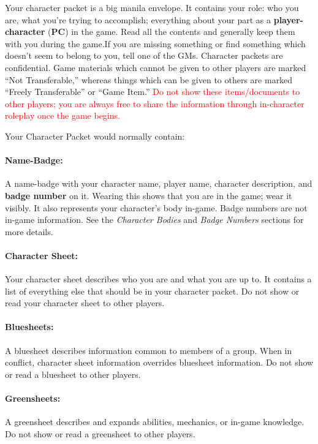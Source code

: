 \documentclass[sheet]{GL2020}
\begin{document}
Your character packet is a big manila envelope.  It contains your role: who you are, what you're trying to accomplish; everything about your part as a {\bf player-character} ({\bf PC}) in the game. Read all the contents and generally keep them with you during the game.If you are missing something or find something which doesn't seem to belong to you, tell one of the GMs.  Character packets are confidential. Game materials which cannot be given to other players are marked ``Not Transferable,'' whereas things which can be given to others are marked ``Freely Transferable'' or ``Game Item.''  \textcolor{red}{Do not show these items/documents to other players; you are always free to share the information through in-character roleplay once the game begins.}

Your Character Packet would normally contain:
\paragraph{Name-Badge:} A name-badge with your character name, player name, character description, and {\bf badge number} on it. Wearing this shows that you are in the game; wear it visibly.  It also represents your character's body in-game.  Badge numbers are not in-game information. See the \emph{Character Bodies} and \emph{Badge Numbers} sections for more details.

\paragraph{Character Sheet:} Your character sheet describes who you are and what you are up to.  It contains a list of everything else that should be in your character packet. Do not show or read your character sheet to other players.

\paragraph{Bluesheets:} A bluesheet describes information common to members of a group.  When in conflict, character sheet information overrides bluesheet information. Do not show or read a bluesheet to other players.

\paragraph{Greensheets:} A greensheet describes and expands abilities, mechanics, or in-game knowledge. Do not show or read a greensheet to other players.
\end{document}
